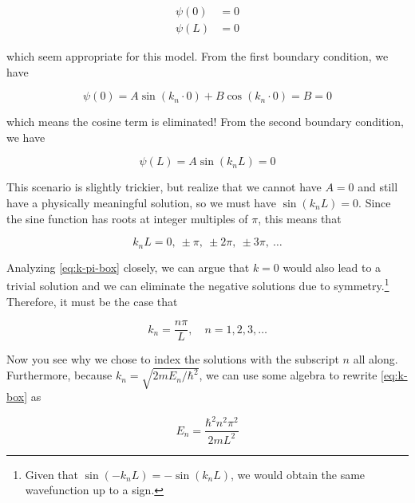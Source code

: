 \begin{align}
	\psi(0) &= 0 \\
	\psi(L) &= 0
\end{align}

\noindent which seem appropriate for this model. 
From the first boundary condition, we have

\begin{equation*}
	\psi(0) = A\sin(k_n \cdot 0) + B\cos(k_n \cdot 0) = B = 0
\end{equation*}

\noindent which means the cosine term is eliminated! 
From the second boundary condition, we have

\begin{equation*}
	\psi(L) = A\sin(k_nL) = 0
\end{equation*}

This scenario is slightly trickier, but realize that we cannot have $A = 0$ and still have a physically meaningful solution, so we must have $\sin(k_nL) = 0$. 
Since the sine function has roots at integer multiples of $\pi$, this means that

\begin{equation}
	k_nL = 0,\ \pm\pi,\ \pm2\pi,\ \pm3\pi,\ \dots \label{eq:k-pi-box}
\end{equation}

Analyzing \autoref{eq:k-pi-box} closely, we can argue that $k = 0$ would also lead to a trivial solution and we can eliminate the negative solutions due to symmetry.\footnote{Given that $\sin(-k_nL) = -\sin(k_nL)$, we would obtain the same wavefunction up to a sign.} 
Therefore, it must be the case that 

\begin{tcolorbox}[title=Allowed values of $k$] \vspace{-2ex}
	\begin{equation}
		k_n = \frac{n\pi}{L}, \quad n = 1, 2, 3, \dots   
		\label{eq:k-box}
	\end{equation}
\end{tcolorbox}

Now you see why we chose to index the solutions with the subscript $n$ all along. 
Furthermore, because $k_n = \sqrt{2mE_n/\hbar^2}$, we can use some algebra to rewrite \autoref{eq:k-box} as

\begin{tcolorbox}[title = Allowed energies] \vspace{-2ex}
	\begin{equation}
		E_n = \frac{\hbar^2n^2\pi^2}{2mL^2} 
		\label{eq:E-box}
	\end{equation}
\end{tcolorbox}

